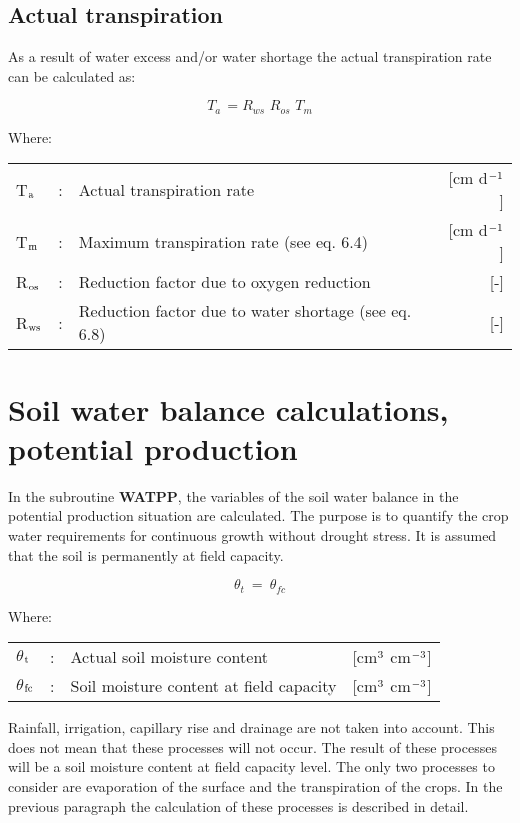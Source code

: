 \subsection{Actual transpiration}
As a result of water excess and/or water shortage the actual transpiration rate can be
calculated as:

\begin{equation}
T_{a~} = R_{ws} \,\, R_{os} \,\, T_{m} 
\end{equation}

Where:\\[5pt]
\begin{tabularx}{\textwidth}{llXr}
 T$_{{\rm a}}$ &:& Actual transpiration rate & [cm d$^{{\rm -1}}$]\\
 T$_{{\rm m}}$ &:& Maximum transpiration rate (see eq. 6.4) & [cm d$^{{\rm -1}}$]\\
 R$_{{\rm os}}$ &:& Reduction factor due to oxygen reduction & [-]\\
 R$_{{\rm ws}}$ &:& Reduction factor due to water shortage (see eq. 6.8) & [-]\\
\end{tabularx}
 
\section{Soil water balance calculations, potential production}

In the subroutine {\bf WATPP}, the variables of the soil water balance in the potential 
production situation are calculated. The purpose is to quantify the crop water requirements for
continuous growth without drought stress. It is assumed that the soil is permanently at
field capacity.

\begin{equation}
\theta  _{t} ~ =~\theta  _{fc} 
\end{equation}

Where:\\[5pt]
\begin{tabularx}{\textwidth}{llXr}
 $\theta$$_{{\rm t}}$ &:& Actual soil moisture content & [cm$^{{\rm 3}}$ cm$^{{\rm -3}}$]\\
 $\theta$$_{{\rm fc}}$ &:& Soil moisture content at field capacity & [cm$^{{\rm 3}}$ cm$^{{\rm -3}}$]\\
\end{tabularx}
 
Rainfall, irrigation, capillary rise and drainage are not taken into account. This does not
mean that these processes will not occur. The result of these processes will be a soil
moisture content at field capacity level. The only two processes to consider are evapora\-tion of 
the surface and the transpiration of the crops. In the previous paragraph the
calculation of these processes is described in detail.

